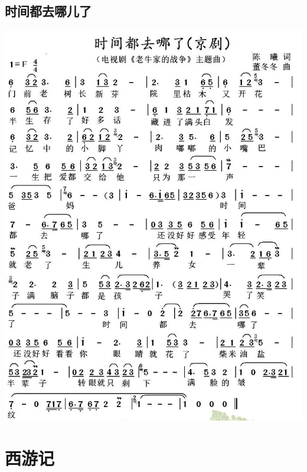 \documentclass[cn,pad,chinesefont=nofont,twocol]{elegantbook}
\begin{document}
\section{时间都去哪儿了}
    \includegraphics[width=\textwidth]{dongxiao/20200411-时间都去哪儿了.jpg}
                   
\chapter{西游记}
\end{document}
